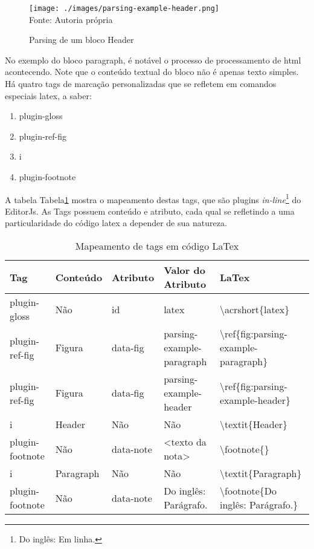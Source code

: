 \begin{figure}[H]
    \centering
    \caption{Parsing de um bloco Header}
    \texttt{[image: ./images/parsing-example-header.png]}
    \label{fig:parsing-example-header} \\
    \textnormal{\fontsize{10pt}{12pt}Fonte: Autoria própria}
\end{figure}

No exemplo do bloco paragraph, é notável o processo de
processamento de
\acrshort{html}
acontecendo. Note que o conteúdo textual do bloco
não é apenas texto simples. Há quatro tags de
marcação personalizadas que se refletem em comandos
especiais
\acrshort{latex}, a saber:

\begin{enumerate}
        
	\item plugin-gloss
	\item plugin-ref-fig
	\item i
	\item plugin-footnote
    
\end{enumerate}

A tabela
Tabela\ref{tbl:plugins-latex-mapping}
mostra o mapeamento destas tags, que são plugins
\textit{in-line}\footnote{Do inglês: Em linha.
}
do EditorJs. As Tags possuem conteúdo e atributo, cada qual se
refletindo a uma particularidade do código
\acrshort{latex}
a depender de sua natureza.

\begin{table}[H]
    \centering
    \caption{Mapeamento de tags em código LaTex}
    \label{tbl:plugins-latex-mapping}
    \renewcommand{\arraystretch}{1.5}
    \begin{tabular}{p{1.92cm} p{1.92cm} p{1.92cm} p{3.2cm} p{7.04cm}}
        \hline
        \textbf{Tag} & \textbf{Conteúdo} & \textbf{Atributo} & \textbf{Valor do Atributo} & \textbf{LaTex} \\
        \hline
        plugin-gloss & Não & id & latex & \textbackslash acrshort\{latex\} \\
		plugin-ref-fig & Figura & data-fig & parsing-example-paragraph & \textbackslash ref\{fig:parsing-example-paragraph\} \\
		plugin-ref-fig & Figura & data-fig & parsing-example-header & \textbackslash ref\{fig:parsing-example-header\} \\
		i & Header & Não & Não & \textbackslash textit\{Header\} \\
		plugin-footnote & Não & data-note & <texto da nota> & \textbackslash footnote\{<texto da nota>\} \\
		i & Paragraph & Não & Não & \textbackslash textit\{Paragraph\} \\
		plugin-footnote & Não & data-note & Do inglês: Parágrafo. & \textbackslash footnote\{Do inglês: Parágrafo.\} \\
        \hline
        
    \end{tabular}
\end{table}

